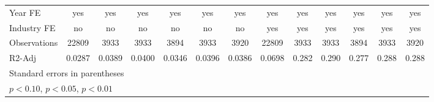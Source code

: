 {\begin{tabular}{l*{12}{c}}
\hline
Year FE             &         yes         &         yes         &         yes         &         yes         &         yes         &         yes         &         yes         &         yes         &         yes         &         yes         &         yes         &         yes         \\
Industry FE         &          no         &          no         &          no         &          no         &          no         &          no         &         yes         &         yes         &         yes         &         yes         &         yes         &         yes         \\
Observations        &       22809         &        3933         &        3933         &        3894         &        3933         &        3920         &       22809         &        3933         &        3933         &        3894         &        3933         &        3920         \\
R2-Adj              &      0.0287         &      0.0389         &      0.0400         &      0.0346         &      0.0396         &      0.0386         &      0.0698         &       0.282         &       0.290         &       0.277         &       0.288         &       0.288         \\
\hline\hline
\multicolumn{13}{l}{\footnotesize Standard errors in parentheses}\\
\multicolumn{13}{l}{\footnotesize \sym{*} \(p<0.10\), \sym{**} \(p<0.05\), \sym{***} \(p<0.01\)}\\
\end{tabular}
}
